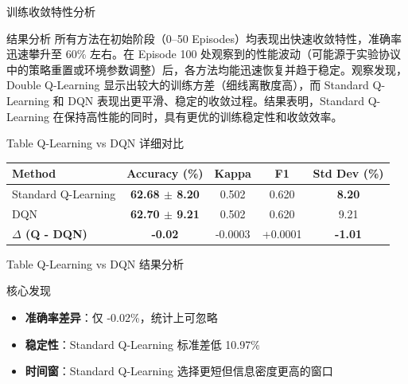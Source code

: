 {\begin{frame}{训练收敛特性分析}

    \vspace{0.2cm}
    \begin{block}{结果分析}
        \footnotesize
        所有方法在初始阶段（0--50 Episodes）均表现出快速收敛特性，准确率迅速攀升至 60\% 左右。在 Episode 100 处观察到的性能波动（可能源于实验协议中的策略重置或环境参数调整）后，各方法均能迅速恢复并趋于稳定。观察发现，Double Q-Learning 显示出较大的训练方差（细线离散度高），而 Standard Q-Learning 和 DQN 表现出更平滑、稳定的收敛过程。结果表明，Standard Q-Learning 在保持高性能的同时，具有更优的训练稳定性和收敛效率。
    \end{block}
\end{frame}

\begin{frame}{Table Q-Learning vs DQN 详细对比}
    \footnotesize
    \renewcommand{\arraystretch}{1.1}
    \begin{tabular}{lcccc}
        \hline
        \textbf{Method} & \textbf{Accuracy (\%)} & \textbf{Kappa} & \textbf{F1} & \textbf{Std Dev (\%)} \\
        \hline
        Standard Q-Learning & \textbf{62.68 $\pm$ 8.20} & 0.502 & 0.620 & \textbf{8.20}  \\
        DQN & \textbf{62.70 $\pm$ 9.21} & 0.502 & 0.620 & 9.21  \\
        \textbf{$\Delta$ (Q - DQN)} & \textbf{-0.02} & -0.0003 & +0.0001 & \textbf{-1.01}  \\
        \hline
    \end{tabular}
\end{frame}

\begin{frame}{Table Q-Learning vs DQN 结果分析}
    \begin{block}{核心发现}
        \footnotesize
        \begin{itemize}
            \item \textbf{准确率差异}：仅 -0.02\%，统计上可忽略
            \item \textbf{稳定性}：Standard Q-Learning 标准差低 10.97\%
            \item \textbf{时间窗}：Standard Q-Learning 选择更短但信息密度更高的窗口
        \end{itemize}
    \end{block}


\end{frame}}
